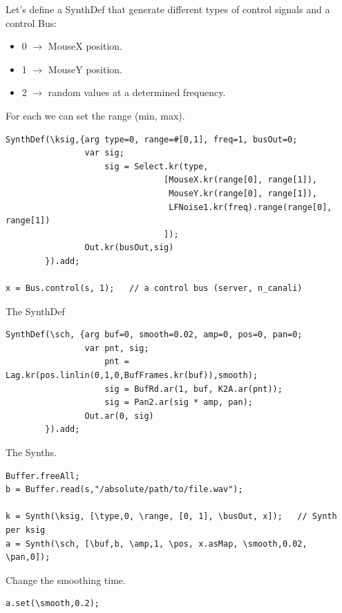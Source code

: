 Let's define a SynthDef that generate different types of control signals and a control Bus:
\begin{itemize}
\tightlist
\item 0 $\rightarrow$ MouseX position.
\item 1 $\rightarrow$ MouseY position.
\item 2 $\rightarrow$ random values at a determined frequency.
\end{itemize}

For each we can set the range (min, max).

\begin{lstlisting}[frame=single, caption=Control signals model,label=control] 
SynthDef(\ksig,{arg type=0, range=#[0,1], freq=1, busOut=0;
                var sig;
	                sig = Select.kr(type,
                                [MouseX.kr(range[0], range[1]),
                                 MouseY.kr(range[0], range[1]),
                                 LFNoise1.kr(freq).range(range[0], range[1])
                                ]);
	            Out.kr(busOut,sig)
        }).add;

x = Bus.control(s, 1);   // a control bus (server, n_canali)
\end{lstlisting}

The SynthDef

\begin{lstlisting}[frame=single, caption=Scratcher model] 
SynthDef(\sch, {arg buf=0, smooth=0.02, amp=0, pos=0, pan=0;
                var pnt, sig;
                    pnt = Lag.kr(pos.linlin(0,1,0,BufFrames.kr(buf)),smooth);
                    sig = BufRd.ar(1, buf, K2A.ar(pnt));
                    sig = Pan2.ar(sig * amp, pan);
                Out.ar(0, sig)
        }).add;
\end{lstlisting}

The Synths.

\begin{lstlisting}[frame=single] 
Buffer.freeAll;
b = Buffer.read(s,"/absolute/path/to/file.wav");

k = Synth(\ksig, [\type,0, \range, [0, 1], \busOut, x]);   // Synth per ksig
a = Synth(\sch, [\buf,b, \amp,1, \pos, x.asMap, \smooth,0.02, \pan,0]);
\end{lstlisting}

Change the smoothing time.

\begin{lstlisting}[frame=single] 
a.set(\smooth,0.2);
\end{lstlisting}

